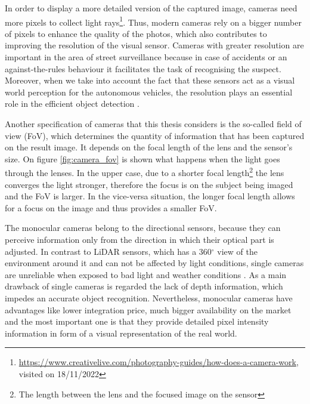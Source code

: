 \newpage
In order to display a more detailed version of the captured image, cameras need more pixels to collect light rays\footnote{\url{https://www.creativelive.com/photography-guides/how-does-a-camera-work}, visited on 18/11/2022}. Thus, modern cameras rely on a bigger number of pixels to enhance the quality of the photos, which also contributes to improving the resolution of the visual sensor. Cameras with greater resolution are important in the area of street surveillance because in case of accidents or an against-the-rules behaviour it facilitates the task of recognising the suspect. Moreover, when we take into account the fact that these sensors act as a visual world perception for the autonomous vehicles, the resolution plays an essential role in the efficient object detection \cite{resolution_importance}. 

Another specification of cameras that this thesis considers is the so-called field of view (FoV), which determines the quantity of information that has been captured on the result image. It depends on the focal length of the lens and the sensor's size. On figure \ref{fig:camera_fov} is shown what happens when the light goes through the lenses. In the upper case, due to a shorter focal length\footnote{The length between the lens and the focused image on the sensor} the lens converges the light stronger, therefore the focus is on the subject being imaged and the FoV is larger. In the vice-versa situation, the longer focal length allows for a focus on the image and thus provides a smaller FoV.

The monocular cameras belong to the directional sensors, because they can perceive information only from the direction in which their optical part is adjusted. In contrast to LiDAR sensors, which has a 360$^{\circ}$ view of the environment around it and can not be affected by light
conditions, single cameras are unreliable when exposed to bad light and weather conditions \cite{camera_vs_lidar}. As a main drawback of single cameras is regarded the lack of depth information, which impedes an accurate object recognition. Nevertheless, monocular cameras have advantages like lower integration price, much bigger availability on the market and the most important one is that they provide detailed pixel intensity information in form of a visual representation of the real world.

